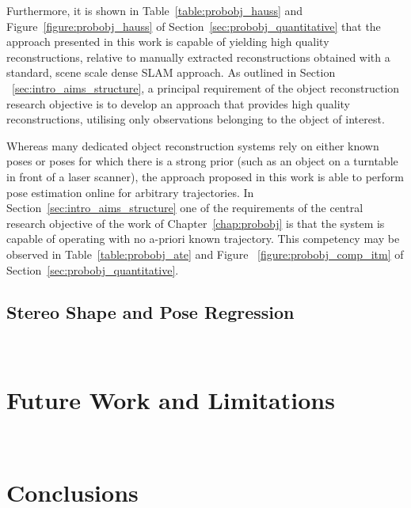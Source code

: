 Furthermore, it is shown in Table~\ref{table:probobj_hauss} and Figure~\ref{figure:probobj_hauss} 
of Section~\ref{sec:probobj_quantitative} that the approach presented in this work is capable of 
yielding high quality reconstructions, relative to manually extracted reconstructions obtained 
with a standard, scene scale dense SLAM approach. As outlined in Section
~\ref{sec:intro_aims_structure}, a principal requirement of the object reconstruction research 
objective is to develop an approach that provides high quality reconstructions, utilising only 
observations belonging to the object of interest.

Whereas many dedicated object reconstruction systems rely on either known poses or poses for which 
there is a strong prior (such as an object on a turntable in front of a laser scanner), the approach 
proposed in this work is able to perform pose estimation online for arbitrary trajectories. In 
Section~\ref{sec:intro_aims_structure} one of the requirements of the central research objective of 
the work of Chapter~\ref{chap:probobj} is that the system is capable of operating with no a-priori
known trajectory. This competency may be observed in Table~\ref{table:probobj_ate} and Figure
~\ref{figure:probobj_comp_itm} of Section~\ref{sec:probobj_quantitative}.


\subsection{Stereo Shape and Pose Regression}
~\label{subsec:discussion_spp}

\section{Future Work and Limitations}
~\label{sec:discussion_limitations}




\section{Conclusions}
~\label{sec:discussion_conclusions}